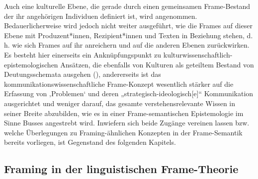 Auch eine kulturelle Ebene, die gerade durch einen gemeinsamen Frame-Bestand der ihr angehörigen Individuen definiert ist, wird angenommen. Bedauerlicherweise wird jedoch nicht weiter ausgeführt, wie die Frames auf dieser Ebene mit Produzent*innen, Rezipient*innen und Texten in Beziehung stehen, d.\,h. wie sich Frames auf ihr anreichern und auf die anderen Ebenen zurückwirken. Es besteht hier einerseits ein Anknüpfungspunkt zu kulturwissenschaftlich-epistemologischen Ansätzen, die ebenfalls von Kulturen als geteiltem Bestand von Deutungsschemata ausgehen (), andererseits ist das kommunikationswissenschaftliche Frame-Konzept wesentlich stärker auf die Erfassung von ‚Problemen` und deren „strategisch-ideologisch{[}e{]}`` \autocite[147]{ziemFramesAlsPraedikations2014} Kommunikation ausgerichtet und weniger darauf, das gesamte verstehensrelevante Wissen in seiner Breite abzubilden, wie es in einer Frame-semantischen Epistemologie im Sinne Busses angestrebt wird. Inwiefern sich beide Zugänge vereinen lassen bzw. welche Überlegungen zu Framing-ähnlichen Konzepten in der Frame-Semantik bereits vorliegen, ist Gegenstand des folgenden Kapitels.

\subsection{Framing in der linguistischen Frame-Theorie}\label{framing-in-der-linguistischen-frame-theorie}

